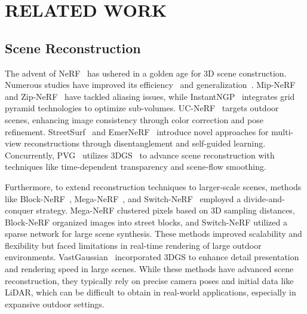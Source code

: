 \section{RELATED WORK}
\subsection{Scene Reconstruction}
The advent of NeRF~\citep{nerf} has ushered in a golden age for 3D scene construction. Numerous studies have improved its efficiency~\citep{hedman2021snerg, instantngp, Reiser2023SIGGRAPH} and generalization~\citep{yu2021pixelnerf, wang2021ibrnet, chen2021mvsnerf}. Mip-NeRF~\citep{barron2021mipnerf} and Zip-NeRF~\citep{barron2023zipnerf} have tackled aliasing issues, while InstantNGP~\citep{instantngp} integrates grid pyramid technologies to optimize sub-volumes. UC-NeRF~\citep{ucnerf} targets outdoor scenes, enhancing image consistency through color correction and pose refinement. StreetSurf~\citep{guo2023streetsurf} and EmerNeRF~\citep{yang2023emernerf} introduce novel approaches for multi-view reconstructions through disentanglement and self-guided learning. Concurrently, PVG~\citep{chen2024periodic} utilizes 3DGS~\citep{kerbl3Dgaussians} to advance scene reconstruction with techniques like time-dependent transparency and scene-flow smoothing.

Furthermore, to extend reconstruction techniques to larger-scale scenes, methods like Block-NeRF~\citep{tancik2022blocknerf}, Mega-NeRF~\citep{meganerf}, and Switch-NeRF~\citep{mi2023switchnerf} employed a divide-and-conquer strategy. Mega-NeRF clustered pixels based on 3D sampling distances, Block-NeRF organized images into street blocks, and Switch-NeRF utilized a sparse network for large scene synthesis. These methods improved scalability and flexibility but faced limitations in real-time rendering of large outdoor environments. VastGaussian~\citep{lin2024vastgaussian} incorporated 3DGS to enhance detail presentation and rendering speed in large scenes. While these methods have advanced scene reconstruction, they typically rely on precise camera poses and initial data like LiDAR, which can be difficult to obtain in real-world applications, especially in expansive outdoor settings.

